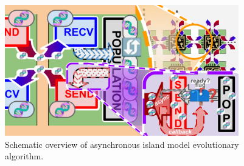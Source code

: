 \begin{figure}[htbp]
\includegraphics[width=4in]{img/async-ga-schematic.pdf}
\centering
\caption{Schematic overview of asynchronous island model evolutionary algorithm.}
\label{fig:async-ga-schematic}
\end{figure}